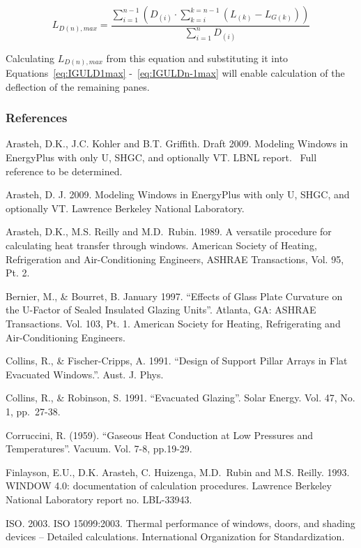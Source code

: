 \begin{equation}
{L_{D\left( n \right),max}} = \frac{{\mathop \sum \nolimits_{i = 1}^{n - 1} ({D_{\left( i \right)}}\cdot \mathop \sum \nolimits_{k = i}^{k = n - 1} \left( {{L_{\left( k \right)}} - {L_{G\left( k \right)}}} \right))}}{{\mathop \sum \nolimits_{i = 1}^n {D_{\left( i \right)}}}}
\end{equation}

Calculating \({L_{D\left( n \right),max}}\) from this equation and substituting it into Equations~\ref{eq:IGULD1max} -~\ref{eq:IGULDn-1max} will enable calculation of the deflection of the remaining panes.

\subsubsection{References}\label{references-1-019}

Arasteh, D.K., J.C. Kohler and B.T. Griffith. Draft 2009. Modeling Windows in EnergyPlus with only U, SHGC, and optionally VT. LBNL report.~ Full reference to be determined.

Arasteh, D. J. 2009. Modeling Windows in EnergyPlus with only U, SHGC, and optionally VT. Lawrence Berkeley National Laboratory.

Arasteh, D.K., M.S. Reilly and M.D.~Rubin. 1989. A versatile procedure for calculating heat transfer through windows. American Society of Heating, Refrigeration and Air-Conditioning Engineers, ASHRAE Transactions, Vol. 95, Pt. 2.

Bernier, M., \& Bourret, B. January 1997. ``Effects of Glass Plate Curvature on the U-Factor of Sealed Insulated Glazing Units''. Atlanta, GA: ASHRAE Transactions. Vol. 103, Pt. 1. American Society for Heating, Refrigerating and Air-Conditioning Engineers.

Collins, R., \& Fischer-Cripps, A. 1991. ``Design of Support Pillar Arrays in Flat Evacuated Windows.''. Aust. J. Phys.

Collins, R., \& Robinson, S. 1991. ``Evacuated Glazing''. Solar Energy. Vol. 47, No. 1, pp.~27-38.

Corruccini, R. (1959). ``Gaseous Heat Conduction at Low Pressures and Temperatures''. Vacuum. Vol. 7-8, pp.19-29.

Finlayson, E.U., D.K. Arasteh, C. Huizenga, M.D.~Rubin and M.S. Reilly. 1993. WINDOW 4.0: documentation of calculation procedures. Lawrence Berkeley National Laboratory report no. LBL-33943.

ISO. 2003. ISO 15099:2003. Thermal performance of windows, doors, and shading devices -- Detailed calculations. International Organization for Standardization.

